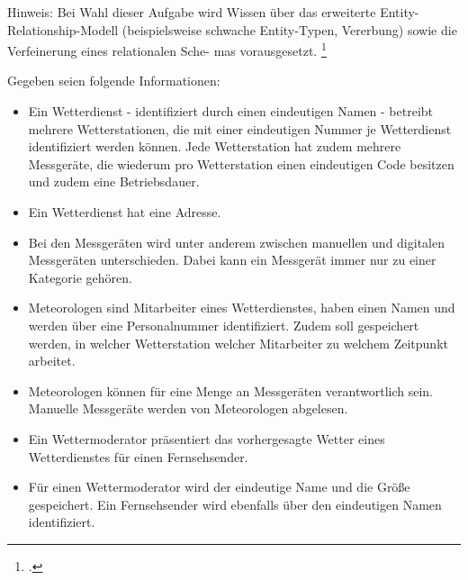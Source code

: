 \documentclass{bschlangaul-aufgabe}
\begin{document}

Hinweis: Bei Wahl dieser Aufgabe wird Wissen über das erweiterte Entity-
Relationship-Modell (beispielsweise schwache Entity-Typen, Vererbung)
sowie die Verfeinerung eines relationalen Sche- mas vorausgesetzt.
\footcite{examen:66116:2020:03}

Gegeben seien folgende Informationen:
\begin{itemize}

\item Ein Wetterdienst - identifiziert durch einen eindeutigen Namen -
betreibt mehrere Wetterstationen, die mit einer eindeutigen Nummer je
Wetterdienst identifiziert werden können. Jede Wetterstation hat zudem
mehrere Messgeräte, die wiederum pro Wetterstation einen eindeutigen
Code besitzen und zudem eine Betriebsdauer.

\item Ein Wetterdienst hat eine Adresse.

\item Bei den Messgeräten wird unter anderem zwischen manuellen und
digitalen Messgeräten unterschieden. Dabei kann ein Messgerät immer nur
zu einer Kategorie gehören.

\item Meteorologen sind Mitarbeiter eines Wetterdienstes, haben einen
Namen und werden über eine Personalnummer identifiziert. Zudem soll
gespeichert werden, in welcher Wetterstation welcher Mitarbeiter zu
welchem Zeitpunkt arbeitet.

\item Meteorologen können für eine Menge an Messgeräten verantwortlich
sein. Manuelle Messgeräte werden von Meteorologen abgelesen.

\item Ein Wettermoderator präsentiert das vorhergesagte Wetter eines
Wetterdienstes für einen Fernsehsender.

\item Für einen Wettermoderator wird der eindeutige Name und die Größe
gespeichert. Ein Fernsehsender wird ebenfalls über den eindeutigen
Namen identifiziert.

\end{itemize}
\end{document}
